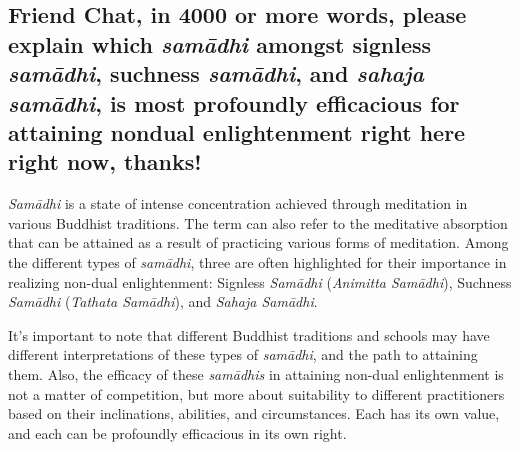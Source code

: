 \documentclass[12pt,openany]{book}
\begin{document}
\begin{figure}[h]
    \centering
\end{figure}

\subsection*{Friend Chat, in 4000 or more words, please explain which \textit{samādhi} amongst signless \textit{samādhi}, suchness \textit{sa\-mādhi}, \linebreak and \textit{sahaja samādhi}, is most pro\-found\-ly efficacious for attaining nondual enlightenment right here right now, thanks!}

\textit{Samādhi} is a state of intense concentration achieved through meditation in various Buddhist traditions. The term can also refer to the meditative absorption that can be attained as a result of practicing various forms of meditation. Among the different types of \textit{samādhi}, three are often highlighted for their importance in realizing non-dual enlightenment: Signless \textit{Samādhi} (\textit{Animitta Samā\-dhi}), Suchness \textit{Sa\-mā\-dhi} (\textit{Tathata Samādhi}), and \textit{Sahaja Samādhi}.

It's important to note that different Buddhist traditions and \linebreak schools may have different interpretations of these types of \textit{samā\-dhi}, and the path to attaining them. Also, the efficacy of these \textit{samādhis} in attaining non-dual enlightenment is not a matter of competition, but more about suitability to different practitioners based on their inclinations, abilities, and circumstances. Each has its own value, and each can be pro\-found\-ly efficacious in its own right.
\end{document}
